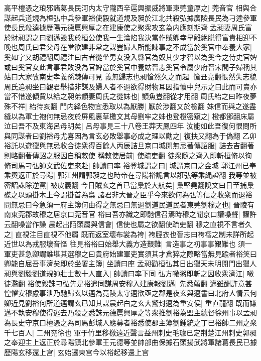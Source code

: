 高平檀憑之琅邪諸葛長民河内太守隴西辛扈興振威將軍東莞童厚之|{
	莞音官}
相與合謀起兵道規為桓弘中兵參軍裕使毅就道規及昶於江北共殺弘據廣陵長民為刁逵參軍使長民殺逵據歷陽元德扈興厚之在建康使之聚衆攻玄為内應刻期齊孟昶妻周氏富於財昶謂之曰劉邁毁我於桓公使我一生淪陷我決當作賊卿幸早離絶脱得富貴相迎不晚也周氏曰君父母在堂欲建非常之謀豈婦人所能諫事之不成當於奚官中奉養大家|{
	奚如字又胡禮翻周禮注曰古者從坐男女没入縣官為奴其少才智以為奚今之侍史官婢或曰奚官女此言事君敗没為官婢當於奚官中養姑晉志奚官令屬少府晉宋間子婦稱其姑曰大家攷南史孝義孫棘傳可見}
義無歸志也昶愴然久之而起|{
	愴丑亮翻悵然失志貌}
周氏追昶坐曰觀君舉措非謀及婦人者不過欲得財物耳因指懷中兒示之曰此而可賣亦當不惜遂傾貲以給之昶弟顗妻周氏之從妹也|{
	顗魚豈翻從才用翻}
周氏紿之曰昨夜夢殊不祥|{
	紿待亥翻}
門内絳色物宜悉取以為厭勝|{
	厭於涉翻又於檢翻}
妹信而與之遂盡縫以為軍士袍何無忌夜於屏風裏草檄文其母劉牢之姊也登橙密窺之|{
	橙都鄧翻床屬}
泣曰吾不及東海呂母明矣|{
	呂母事見三十八卷王莽天鳳四年}
汝能如此吾復何恨問所與同謀者曰劉裕母尤喜因為言玄必敗舉事必成之理以勸之|{
	復扶又翻為于偽翻}
乙卯裕託以遊獵與無忌收合徒衆得百餘人丙辰詰旦京口城開無忌著傳詔服|{
	詰去吉翻著則略翻著傳詔之服因自稱敕使}
稱敕使居前|{
	使疏吏翻}
徒衆隨之齊入即斬桓脩以徇脩司馬刁弘帥文武佐吏來赴|{
	帥讀曰率}
裕登城謂之曰|{
	城謂京口之金城}
郭江州已奉乘輿返正於尋陽|{
	郭江州謂郭昶之也時帝在尋陽裕詭言以誑弘等乘䋲證翻}
我等並被密詔誅除逆黨|{
	被皮義翻}
今日賊玄之首已當梟於大航矣|{
	梟堅堯翻說文曰日至捕梟磔之以頭掛木上今謂掛首為梟}
諸君非大晉之臣乎今來欲何為弘等信之收衆而退裕問無忌曰今急須一府主簿何由得之無忌曰無過劉道民道民者東莞劉穆之也|{
	晉陵有南東莞郡故穆之居京口莞音官}
裕曰吾亦識之即馳信召焉時穆之聞京口讙噪聲|{
	讙許云翻噪當作譟}
晨起出陌頭屬與信會|{
	信使也屬之欲翻使疏吏翻}
穆之直視不言者久之|{
	直視注目直視不他屬}
既而返室壞布裳為袴|{
	袴脛衣也晉志曰袴褶之制未詳所起近世以為戎服壞音怪}
往見裕裕曰始舉大義方造艱難|{
	言造事之初事事艱難也}
須一軍吏甚急卿謂誰堪其選穆之曰貴府始建軍吏實須其才倉猝之際略當無見踰者裕笑曰卿能自屈吾事濟矣即於坐署主簿|{
	坐讀曰座}
孟昶勸桓弘其日出獵天未明開門出獵人昶與劉毅劉道規帥壯士數十人直入|{
	帥讀曰率下同}
弘方噉粥即斬之因收衆濟江|{
	噉徒濫翻}
裕使毅誅刁弘先是裕遣同謀周安穆入建康報劉邁|{
	先悉薦翻}
邁雖酬許意甚惶懼安穆慮事泄乃馳歸玄以邁為竟陵太守邁欲亟之郡是夜玄與邁書曰北府人情云何卿近見劉裕何所道邁謂玄已知其謀晨起白之玄大驚封邁為重安侯|{
	重直龍翻}
既而嫌邁不執安穆使得逃去乃殺之悉誅元德扈興厚之等衆推劉裕為盟主總督徐州事以孟昶為長史守京口檀憑之為司馬彭城人應募者裕悉使郡主簿劉鍾統之丁巳裕帥二州之衆千七百人|{
	二州兖徐也}
軍于竹里移檄遠近聲言益州刺史毛璩已定荆楚江州刺史郭昶之奉迎主上返正於尋陽鎮北參軍王元德等並帥部曲保據石頭揚武將軍諸葛長民已據歷陽玄移還上宫|{
	玄始遷東宫今以裕起移還上宫}
